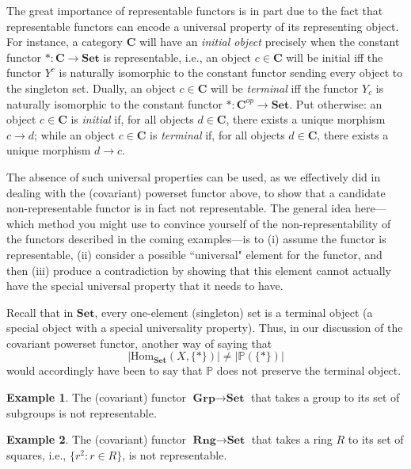 \documentclass[a4paper]{book}
\theoremstyle{definition}
\newtheorem{example}{Example}[section]
\theoremstyle{definition}
\theoremstyle{definition}
\theoremstyle{theorem}
\theoremstyle{definition}
\begin{document}
The great importance of representable functors is in part due to the fact that representable functors can encode a universal property of its representing object. For instance, a category $\textbf{C}$ will have an \textit{initial object} precisely when the constant functor $*: \textbf{C} \rightarrow \textbf{Set}$ is representable, i.e., an object $c \in \textbf{C}$ will be initial iff the functor $Y^c$ is naturally isomorphic to the constant functor sending every object to the singleton set. Dually, an object $c \in \textbf{C}$ will be \textit{terminal} iff the functor $Y_c$ is naturally isomorphic to the constant functor $*: \textbf{C}^{op} \rightarrow \textbf{Set}$. Put otherwise: an object $c \in \textbf{C}$ is \textit{initial} if, for all objects $d \in \textbf{C}$, there exists a unique morphism $c \rightarrow d$; while an object $c \in \textbf{C}$ is \textit{terminal} if, for all objects $d \in \textbf{C}$, there exists a unique morphism $d \rightarrow c$.\par
The absence of such universal properties can be used, as we effectively did in dealing with the (covariant) powerset functor above, to show that a candidate non-representable functor is in fact not representable. The general idea here---which method you might use to convince yourself of the non-representability of the functors described in the coming examples---is to (i) assume the functor is representable, (ii) consider a possible ``universal" element for the functor, and then (iii) produce a contradiction by showing that this element cannot actually have the special universal property that it needs to have. \par 
Recall that in $\textbf{Set}$, every one-element (singleton) set is a terminal object (a special object with a special universality property). Thus, in our discussion of the covariant powerset functor, another way of saying that 
\begin{equation*}
|\text{Hom}_{\textbf{Set}}(X, \{*\})| \neq |\mathbb{P}(\{*\})|
\end{equation*} 
would accordingly have been to say that $\mathbb{P}$ does not preserve the terminal object. 
\begin{example}
	The (covariant) functor $\textbf{Grp} \rightarrow \textbf{Set}$ that takes a group to its set of subgroups is not representable. 	
\end{example} 
\begin{example}
	The (covariant) functor $\textbf{Rng} \rightarrow \textbf{Set}$ that takes a ring $R$ to its set of squares, i.e., $\{r^2: r \in R\}$, is not representable. 
\end{example}
\end{document}
